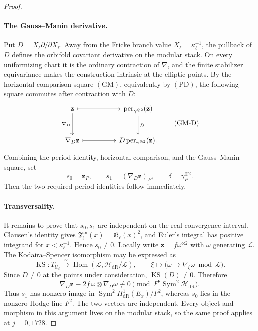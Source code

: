 \documentclass[11pt,a4paper]{amsart} %
\theoremstyle{definition}
\newcommand{\Sym}{\operatorname{Sym}}
\newcommand{\Hom}{\operatorname{Hom}}
\newcommand{\dR}{\mathrm{dR}}
\begin{document}
\begin{proof}
\paragraph{The Gauss--Manin derivative.}
Put \(D=X_\ell\partial/\partial X_\ell\). Away from the Fricke branch value
\(X_\ell=\kappa_\ell^{-1}\), the pullback of \(D\) defines the orbifold
covariant derivative on the modular stack. On every uniformizing chart it is
the ordinary contraction of \(\nabla\), and the finite stabilizer
equivariance makes the construction intrinsic at the elliptic points. By the
horizontal comparison square \((\mathrm{GM})\), equivalently by
\((\mathrm{PD})\), the following square commutes after contraction with
\(D\):
\[
\begin{tikzcd}[column sep=huge,row sep=large]
\mathbf z \arrow[r,mapsto] \arrow[d,"\nabla_D"']
& \operatorname{per}_{\gamma^{\otimes2}}(\mathbf z)
  \arrow[d,"D"]\\
\nabla_D\mathbf z \arrow[r,mapsto]
& D\operatorname{per}_{\gamma^{\otimes2}}(\mathbf z).
\end{tikzcd}
\tag{GM-D}
\]
Combining the period identity, horizontal comparison, and the Gauss--Manin square, set
\[
s_0=\mathbf z_P,
\qquad
s_1=(\nabla_D\mathbf z)_P,
\qquad
\delta=\gamma_P^{\otimes2}.
\]
Then the two required period identities follow immediately.

\paragraph{Transversality.}
It remains to prove that \(s_0,s_1\) are independent on the real convergence
interval. Clausen's identity gives
\({\mathfrak F}^{\mathrm{an}}_\ell(x)=\mathfrak G_\ell(x)^2\), and Euler's
integral has positive integrand for \(x<\kappa_\ell^{-1}\). Hence
\(s_0\ne0\). Locally write \(\mathbf z=f\omega^{\otimes2}\) with
\(\omega\) generating \(\mathcal L\). The Kodaira--Spencer isomorphism may
be expressed as
\[
\operatorname{KS}:T_{\mathcal U_\ell}
\xrightarrow{\ \sim\ }
\Hom\!\left(\mathcal L,\mathcal H_{\dR}/\mathcal L\right),
\qquad
\xi\longmapsto
\bigl(\omega\mapsto\nabla_\xi\omega\bmod\mathcal L\bigr).
\tag{KS}
\]
Since \(D\ne0\) at the points under consideration,
\(\operatorname{KS}(D)\ne0\). Therefore
\[
\nabla_D\mathbf z
\equiv2f\,\omega\otimes\nabla_D\omega
\not\equiv0
\pmod{F^2\Sym^2\mathcal H_{\dR}}.
\]
Thus \(s_1\) has nonzero image in
\(\Sym^2H^1_{\dR}(E_x)/F^2\), whereas \(s_0\) lies in the nonzero Hodge
line \(F^2\). The two vectors are independent. Every object and morphism in
this argument lives on the modular stack, so the same proof applies at
\(j=0,1728\).
\end{proof}
\end{document}
